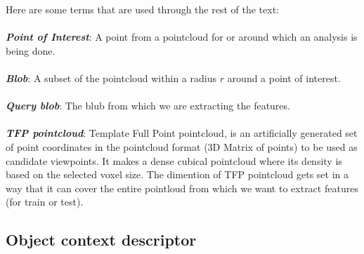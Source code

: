 Here are some terms that are used through the rest of the text:\\
\\
\textbf{\textit{Point of Interest}}: A point from a pointcloud for or around which an analysis is being done.\\
\\
\textbf{\textit{Blob}}: A subset of the pointcloud within a radius $r$ around a point of interest.\\
\\
\textbf{\textit{Query blob}}: The blub from which we are extracting the features.\\
\\
\textbf{\textit{TFP pointcloud}}: Template Full Point pointcloud, is an artificially generated set of point coordinates in the pointcloud format (3D Matrix of points) to be used as candidate viewpoints. It makes a dense cubical pointcloud where its density is based on the selected voxel size. The dimention of TFP pointcloud gets set in a way that it can cover the entire pointloud from which we want to extract features (for train or test).\\



\subsection{Object context descriptor}
\label{OCD.ssec}
 
